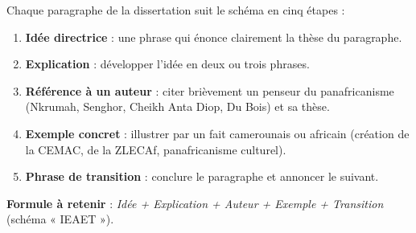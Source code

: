 \documentclass[11pt]{article}
\begin{document}
\begin{methode}
Chaque paragraphe de la dissertation suit le schéma en cinq étapes :
\begin{enumerate}
\item \textbf{Idée directrice} : une phrase qui énonce clairement la thèse du paragraphe.
\item \textbf{Explication} : développer l'idée en deux ou trois phrases.
\item \textbf{Référence à un auteur} : citer brièvement un penseur du panafricanisme (Nkrumah, Senghor, Cheikh Anta Diop, Du Bois) et sa thèse.
\item \textbf{Exemple concret} : illustrer par un fait camerounais ou africain (création de la CEMAC, de la ZLECAf, panafricanisme culturel).
\item \textbf{Phrase de transition} : conclure le paragraphe et annoncer le suivant.
\end{enumerate}
\textbf{Formule à retenir} : \emph{Idée + Explication + Auteur + Exemple + Transition} (schéma « IEAET »).
\end{methode}
\end{document}

